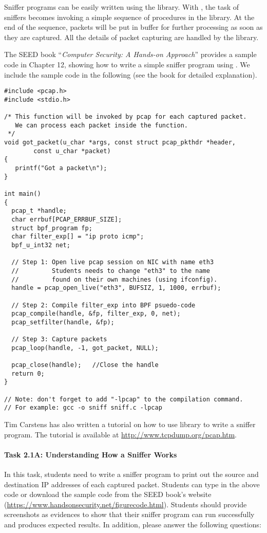 Sniffer programs can be easily written using the \pcap library. With \pcap, 
the task of 
sniffers becomes invoking a simple sequence of procedures
in the \pcap library. At the end of the sequence,
packets will be put in buffer for further processing
as soon as they are captured. All the details 
of packet capturing are handled by the \pcap library.


The SEED book ``\textit{Computer Security: A Hands-on Approach}'' provides a sample code 
in Chapter 12, showing how  to write a simple sniffer program using 
\pcap. We include the sample code in the following (see the book for detailed explanation). 

\begin{lstlisting}
#include <pcap.h>
#include <stdio.h>

/* This function will be invoked by pcap for each captured packet.
   We can process each packet inside the function.  
 */
void got_packet(u_char *args, const struct pcap_pkthdr *header,
        const u_char *packet)
{
   printf("Got a packet\n");
}

int main()
{
  pcap_t *handle;
  char errbuf[PCAP_ERRBUF_SIZE];
  struct bpf_program fp;
  char filter_exp[] = "ip proto icmp";
  bpf_u_int32 net;

  // Step 1: Open live pcap session on NIC with name eth3
  //         Students needs to change "eth3" to the name 
  //         found on their own machines (using ifconfig).
  handle = pcap_open_live("eth3", BUFSIZ, 1, 1000, errbuf); 

  // Step 2: Compile filter_exp into BPF psuedo-code
  pcap_compile(handle, &fp, filter_exp, 0, net);            
  pcap_setfilter(handle, &fp);                              

  // Step 3: Capture packets
  pcap_loop(handle, -1, got_packet, NULL);                  

  pcap_close(handle);   //Close the handle
  return 0;
}

// Note: don't forget to add "-lpcap" to the compilation command.
// For example: gcc -o sniff sniff.c -lpcap
\end{lstlisting}


Tim Carstens has also written a tutorial on how to use 
\pcap library to write a sniffer program. The tutorial is 
available at \url{http://www.tcpdump.org/pcap.htm}.  
 

\paragraph{Task 2.1A: Understanding How a Sniffer Works}
In this task, students need to write a sniffer program to 
print out the source and destination IP addresses of each captured 
packet. Students can type in the above code or download the sample code from the 
SEED book's website (\url{https://www.handsonsecurity.net/figurecode.html}). 
Students should provide screenshots as evidences to show that their sniffer
program can run successfully and produces expected 
results. In addition, please answer the following questions:

